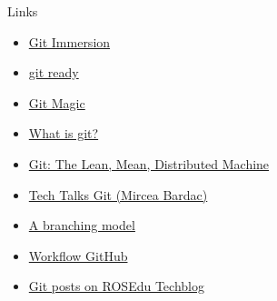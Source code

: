 \documentclass{beamer}
\begin{document}
\begin{frame}{Links}
  \begin{itemize}
    \item \href{http://gitimmersion.com/}{Git Immersion}
    \item \href{http://gitready.com/}{git ready}
    \item \href{http://www-cs-students.stanford.edu/~blynn/gitmagic/index.html}{Git Magic}
    \item \href{http://aht.github.com/whatisgit/\#/cover}{What is git?}
    \item \href{http://www.slideshare.net/err/git-machine}{Git: The Lean, Mean, Distributed Machine}
    \item \href{http://talks.rosedu.org/prezentari/prezentarea03}{Tech Talks Git (Mircea Bardac)}
    \item \href{http://nvie.com/posts/a-successful-git-branching-model/}{A branching model}
    \item \href{http://www.eqqon.com/index.php/Collaborative\_Github\_Workflow}{Workflow GitHub}
    \item \href{http://techblog.rosedu.org/tag/git}{Git posts on ROSEdu Techblog}
  \end{itemize}
\end{frame}
\end{document}
